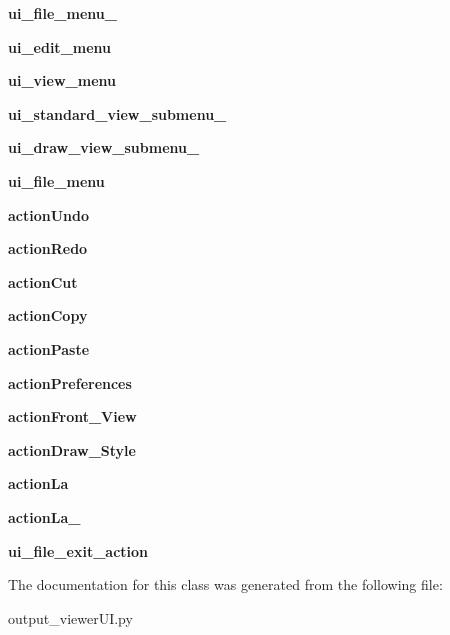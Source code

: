 \begin{DoxyCompactItemize}
\hypertarget{a00105_ad42c5a1028285e160bfb9eb048cd245b}{}\label{a00105_ad42c5a1028285e160bfb9eb048cd245b} 
{\bfseries ui\+\_\+file\+\_\+menu\+\_\+}
\item 
\hypertarget{a00105_a791ff2e9d4693638b8e5220f53f1b8d2}{}\label{a00105_a791ff2e9d4693638b8e5220f53f1b8d2} 
{\bfseries ui\+\_\+edit\+\_\+menu}
\item 
\hypertarget{a00105_aaf13351c59caceedfc932c46217b4cda}{}\label{a00105_aaf13351c59caceedfc932c46217b4cda} 
{\bfseries ui\+\_\+view\+\_\+menu}
\item 
\hypertarget{a00105_a6d61f7e62a75570f3cbb6b5c9553081b}{}\label{a00105_a6d61f7e62a75570f3cbb6b5c9553081b} 
{\bfseries ui\+\_\+standard\+\_\+view\+\_\+submenu\+\_\+}
\item 
\hypertarget{a00105_a5c5ae1d1afe30f77e2be3526c82acd05}{}\label{a00105_a5c5ae1d1afe30f77e2be3526c82acd05} 
{\bfseries ui\+\_\+draw\+\_\+view\+\_\+submenu\+\_\+}
\item 
\hypertarget{a00105_abf378391cb97c7daa1dcc7458ae26d29}{}\label{a00105_abf378391cb97c7daa1dcc7458ae26d29} 
{\bfseries ui\+\_\+file\+\_\+menu}
\item 
\hypertarget{a00105_a885e2a1ee5a96a1e7c1a336ecdd02518}{}\label{a00105_a885e2a1ee5a96a1e7c1a336ecdd02518} 
{\bfseries action\+Undo}
\item 
\hypertarget{a00105_a732cf29558af5ac0db109050e93d03a0}{}\label{a00105_a732cf29558af5ac0db109050e93d03a0} 
{\bfseries action\+Redo}
\item 
\hypertarget{a00105_a20b08adb5b2b3e4f97465cfbdd5c4d27}{}\label{a00105_a20b08adb5b2b3e4f97465cfbdd5c4d27} 
{\bfseries action\+Cut}
\item 
\hypertarget{a00105_a591e47cae22ade3a6bd2a57754db9141}{}\label{a00105_a591e47cae22ade3a6bd2a57754db9141} 
{\bfseries action\+Copy}
\item 
\hypertarget{a00105_a0605f6f6261e3019d29e471b368398ed}{}\label{a00105_a0605f6f6261e3019d29e471b368398ed} 
{\bfseries action\+Paste}
\item 
\hypertarget{a00105_a80387a6115341ac316c2582ffefd7ab1}{}\label{a00105_a80387a6115341ac316c2582ffefd7ab1} 
{\bfseries action\+Preferences}
\item 
\hypertarget{a00105_a808772e632be99f7d84eccedca596604}{}\label{a00105_a808772e632be99f7d84eccedca596604} 
{\bfseries action\+Front\+\_\+\+View}
\item 
\hypertarget{a00105_aa11ed317a9625aff4fd5a794dc570520}{}\label{a00105_aa11ed317a9625aff4fd5a794dc570520} 
{\bfseries action\+Draw\+\_\+\+Style}
\item 
\hypertarget{a00105_aa992117bc609f60f393c8fff5b5dc89f}{}\label{a00105_aa992117bc609f60f393c8fff5b5dc89f} 
{\bfseries action\+La}
\item 
\hypertarget{a00105_a0e5b34f7aad679ffb90131f69372304a}{}\label{a00105_a0e5b34f7aad679ffb90131f69372304a} 
{\bfseries action\+La\+\_}
\item 
\hypertarget{a00105_a825bab69ddd68d04989a3f919debb14f}{}\label{a00105_a825bab69ddd68d04989a3f919debb14f} 
{\bfseries ui\+\_\+file\+\_\+exit\+\_\+action}
\end{DoxyCompactItemize}


The documentation for this class was generated from the following file\+:\begin{DoxyCompactItemize}
\item 
output\+\_\+viewer\+U\+I.\+py\end{DoxyCompactItemize}
